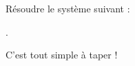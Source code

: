 \documentclass[a4paper,11pt]{article}
\begin{document}
Résoudre le système suivant :

.

C'est tout simple à taper !
\end{document}
